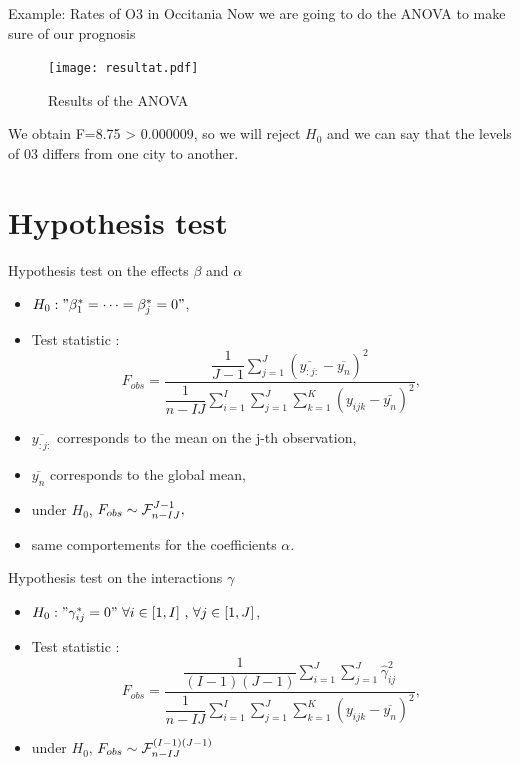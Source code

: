 \documentclass[unknownkeysallowed]{beamer}
\begin{document}
\begin{frame}{Example: Rates of O3 in Occitania}
	Now we are going to do the ANOVA to make sure of our prognosis
	\begin{figure}
		\centering
		\texttt{[image: resultat.pdf]}
		\caption{Results of the ANOVA}
		\label{fig:my_label}
	\end{figure}
	We obtain F=8.75 > 0.000009, so we will reject $H_0$ and we can say that the levels of 03 differs from one city to another.
\end{frame}


\section{Hypothesis test}
\label{sec:test}

\begin{frame}{Hypothesis test on the effects $\beta$ and $\alpha$}
\begin{itemize}
    \item $H_0:"\beta^*_1=\dots = \beta^*_j=0"$,
    \item Test statistic :
    $$F_{obs}=\dfrac{\dfrac{1}{J-1} \sum_{j=1}^J (\overline{y_{:j:}}-\overline{y_n})^2 }{{\dfrac{1}{n-IJ} \sum_{i=1}^I \sum_{j=1}^{J} \sum_{k=1}^{K} ( y_{ijk}-\bar{y_n})^2}},$$
    \item $\overline{y_{:j:}}$ corresponds to the mean on the j-th observation,
    \item $\overline{y_n}$ corresponds to the global mean,
    \item under $H_0$, $F_{obs} \sim \mathcal{F}^{J-1}_{n-IJ},$
    \item same comportements for the coefficients $\alpha$.
\end{itemize}
\end{frame}

\begin{frame}{Hypothesis test on the interactions $\gamma$ }
\begin{itemize}
    \item $H_0:"\gamma^*_{ij}=0" \text{ } \forall i \in [1,I] \text{ , } \forall j \in [1,J]$,
    \item Test statistic : 
    $$F_{obs}=\dfrac{\dfrac{1}{(I-1)(J-1)} \sum_{i=1}^J \sum_{j=1}^J \hat{\gamma}_{ij}^2}{\dfrac{1}{n-IJ}\sum_{i=1}^I \sum_{j=1}^J \sum_{k=1}^K (y_{ijk}-\overline{y_n})^2 },$$
    \item under $H_0$, $F_{obs} \sim \mathcal{F}^{(I-1)(J-1)}_{n-IJ}$
\end{itemize}
\end{frame}
\end{document}
